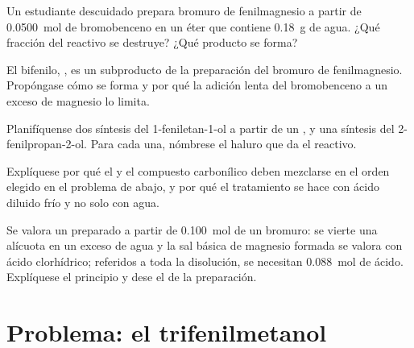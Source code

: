 \begin{exercise}[$\star\star$]\label{exo:b1:organomagnesium:8}
Un estudiante descuidado prepara bromuro de fenilmagnesio a partir de
\qty{0.0500}{mol} de bromobenceno en un éter que contiene \qty{0.18}{g} de
agua. ¿Qué fracción del reactivo se destruye? ¿Qué producto se forma?
\end{exercise}

\begin{exercise}[$\star\star$]\label{exo:b1:organomagnesium:9}
El bifenilo, , es un subproducto de la preparación del
bromuro de fenilmagnesio. Propóngase cómo se forma y por qué la adición
lenta del bromobenceno a un exceso de magnesio lo limita.
\end{exercise}

\begin{exercise}[$\star\star\star$]\label{exo:b1:organomagnesium:10}
Planifíquense dos síntesis del 1-feniletan-1-ol a partir de un , y una síntesis del 2-fenilpropan-2-ol. Para cada una,
nómbrese el haluro que da el reactivo.
\end{exercise}

\begin{exercise}[$\star\star\star$]\label{exo:b1:organomagnesium:11}
Explíquese por qué el  y el compuesto carbonílico
deben mezclarse en el orden elegido en el problema de abajo, y por qué el
tratamiento se hace con ácido diluido frío y no solo con agua.
\end{exercise}

\begin{exercise}[$\star\star\star$]\label{exo:b1:organomagnesium:12}
Se valora un  preparado a partir de \qty{0.100}{mol}
de un bromuro: se vierte una alícuota en un exceso de agua y la sal básica
de magnesio formada se valora con ácido clorhídrico; referidos a toda la
disolución, se necesitan \qty{0.088}{mol} de ácido. Explíquese el
principio y dese el  de la preparación.
\end{exercise}

\section{Problema: el trifenilmetanol}

